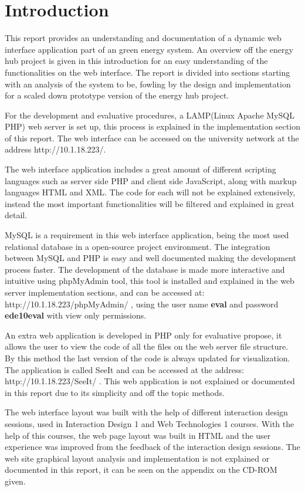 \section{Introduction}
This report provides an understanding and documentation of a dynamic web interface application part of an green energy system. An overview off the energy hub project is given in this introduction for an easy understanding of the functionalities on the web interface. The report is divided into sections starting with an analysis of the system to be, fowling by the design and implementation for a scaled down prototype version of the energy hub project. 

For the development and evaluative procedures, a LAMP(Linux Apache MySQL PHP) web server is set up, this process is explained in the implementation section of this report. The web interface can be accessed on the university network at the address http://10.1.18.223/.

The web interface application includes a great amount of different scripting languages such as server side PHP and client side JavaScript, along with markup languages HTML and XML. The code for each will not be explained extensively, instead the most important functionalities will be filtered and explained in great detail.

MySQL is a requirement in this web interface application, being the most used relational database in a open-source project environment. The integration between MySQL and PHP is easy and well documented making the development process faster. The development of the database is made more interactive and intuitive using phpMyAdmin tool, this tool is installed and explained in the web server implementation sections, and can be accessed at: http://10.1.18.223/phpMyAdmin/ , using the user name \textbf{eval} and password \textbf{ede10eval} with view only permissions.

An extra web application is developed in PHP only for evaluative propose, it allows the user to view the code of all the files on the web server file structure. By this method the last version of the code is always updated for visualization. The application is called SeeIt and can be accessed at the address: http://10.1.18.223/SeeIt/ . This web application is not explained or documented in this report due to its simplicity and off the topic methods.

The web interface layout was built with the help of different interaction design sessions, used in Interaction Design 1 and Web Technologies 1 courses. With the help of this courses, the web page layout was built in HTML and the user experience was improved from the feedback of the interaction design sessions. The web site graphical layout analysis and implementation is not explained or documented in this report, it can be seen on the appendix on the CD-ROM given.

